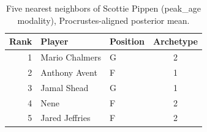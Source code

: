 \begin{table}[htbp]
  \centering\small
  \begin{tabular}{rllc}
    \toprule
    Rank & Player & Position & Archetype \\
    \midrule
    1 & Mario Chalmers & G & 2 \\
    2 & Anthony Avent & F & 1 \\
    3 & Jamal Shead & G & 1 \\
    4 & Nene & F & 2 \\
    5 & Jared Jeffries & F & 2 \\
    \bottomrule
  \end{tabular}
  \caption{Five nearest neighbors of Scottie Pippen (peak_age modality), Procrustes-aligned posterior mean.}
  \label{tab:Scottie_Pippen_neighbors_peak_age}
\end{table}

